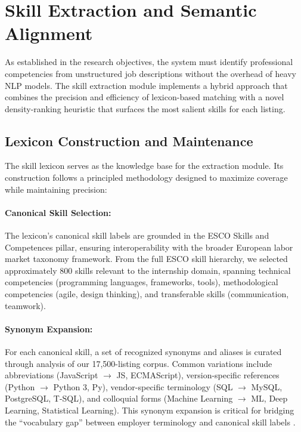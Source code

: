 \section{Skill Extraction and Semantic Alignment}

As established in the research objectives, the system must identify professional competencies from unstructured job descriptions without the overhead of heavy NLP models. The skill extraction module implements a hybrid approach that combines the precision and efficiency of lexicon-based matching with a novel density-ranking heuristic that surfaces the most salient skills for each listing.

\subsection{Lexicon Construction and Maintenance}

The skill lexicon serves as the knowledge base for the extraction module. Its construction follows a principled methodology designed to maximize coverage while maintaining precision:

\paragraph{Canonical Skill Selection:} The lexicon's canonical skill labels are grounded in the ESCO Skills and Competences pillar, ensuring interoperability with the broader European labor market taxonomy framework. From the full ESCO skill hierarchy, we selected approximately 800 skills relevant to the internship domain, spanning technical competencies (programming languages, frameworks, tools), methodological competencies (agile, design thinking), and transferable skills (communication, teamwork).

\paragraph{Synonym Expansion:} For each canonical skill, a set of recognized synonyms and aliases is curated through analysis of our 17,500-listing corpus. Common variations include abbreviations (JavaScript $\rightarrow$ JS, ECMAScript), version-specific references (Python $\rightarrow$ Python 3, Py), vendor-specific terminology (SQL $\rightarrow$ MySQL, PostgreSQL, T-SQL), and colloquial forms (Machine Learning $\rightarrow$ ML, Deep Learning, Statistical Learning). This synonym expansion is critical for bridging the ``vocabulary gap'' between employer terminology and canonical skill labels \cite{giabelli2021skills}.

